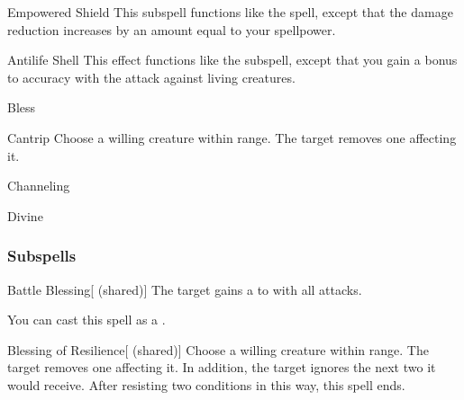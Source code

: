 \begin{ability}[\nth{5}]{Empowered Shield}
This subspell functions like the  spell, except that the damage reduction increases by an amount equal to your spellpower.
\end{ability}
\vspace{0.25em}


\begin{ability}[\nth{7}]{Antilife Shell}
This effect functions like the  subspell, except that you gain a  bonus to accuracy with the attack against living creatures.
\end{ability}
\vspace{0.25em}

\newpage
\begin{spellsection}{Bless}

\begin{spellheader}
\end{spellheader}


\begin{ability}{Cantrip}
Choose a willing creature within \rngclose range.
The target removes one  affecting it.
\end{ability}




 Channeling

 Divine
\end{spellsection}


\subsubsection{Subspells}


\begin{ability}[\nth{1}]{Battle Blessing}[ (shared)]
The target gains a   to  with all attacks.

You can cast this spell as a .
\end{ability}
\vspace{0.25em}


\begin{ability}[\nth{1}]{Blessing of Resilience}[ (shared)]
Choose a willing creature within \rngclose range.
The target removes one  affecting it.
In addition, the target ignores the next two  it would receive.
After resisting two conditions in this way, this spell ends.
\end{ability}
\vspace{0.25em}


